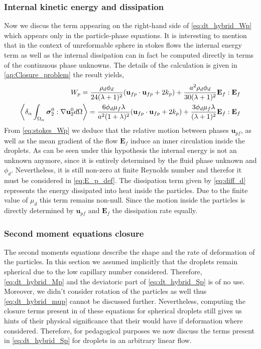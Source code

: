 \subsubsection{Internal kinetic energy and dissipation}
Now we discus the term appearing on the right-hand side of \ref{eq:dt_hybrid_Wp} which appears only in the particle-phase equations. 
It is interesting to mention that in the context of unreformable sphere in stokes flows the internal energy term as well as the internal dissipation can in fact be computed directly in terms of the continuous phase unknowns. 
The details of the calculation is given in \ref{ap:Closure_problem} the result yields, 
\begin{align}
    \label{eq:stokes_Wp}
    W_p =  \frac{\rho_d \phi_d}{24 (\lambda +1)^2}
    (\textbf{u}_{fp} \cdot \textbf{u}_{fp} + 2 k_p)
    + \frac{a^2 \rho_d \phi_d}{30(\lambda+1)^2}
    \textbf{E}_f:\textbf{E}_f    \\
    \left<\delta_\alpha \int_{\Omega_{\alpha}} \bm{\sigma}_2^0:\mathbf{\nabla} \textbf{u}_2^0 d\Omega\right>
    = 
    \frac{6 \phi_d \mu_f \lambda}{a^2(1+\lambda)^2}
    (\textbf{u}_{fp}\cdot \textbf{u}_{fp} + 2k_p)
    + \frac{3 \phi_d \mu_f \lambda}{(\lambda+1)^2}\textbf{E}_f:\textbf{E}_f
    \label{eq:diff_d}
\end{align}
From \ref{eq:stokes_Wp} we deduce that the relative motion between phases $\textbf{u}_{pf}$, as well as the mean gradient of the flow $\textbf{E}_f$ induce an inner circulation inside the droplets. 
As can be seen under this hypothesis the internal energy is not an unknown anymore, since it is entirely determined by the fluid phase unknown and $\phi_d$. 
Nevertheless, it is still non-zero at finite Reynolds number and therefor it must be considered in \ref{eq:E_p_def}. 
The dissipation term given by \ref{eq:diff_d} represents the energy dissipated into heat inside the particles. 
Due to the finite value of $\mu_d$ this term remains non-null. 
Since the motion inside the particles is directly determined by $\textbf{u}_{pf}$ and $\textbf{E}_f$ the dissipation rate equally. 


\subsubsection{Second moment equations closure}

The second moments equations describe the shape and the rate of deformation of the particles.
In this section we assumed implicitly that the droplets remain spherical due to the low capillary number considered. 
Therefore, \ref{eq:dt_hybrid_Mp} and the deviatoric part of \ref{eq:dt_hybrid_Sp} is of no use. 
Moreover, we didn't consider rotation of the particles as well thus \ref{eq:dt_hybrid_mup} cannot be discussed further. 
Nevertheless, computing the closure terms present in of these equations for spherical droplets still gives us hints of their physical significance that their would have if deformation where considered.
Therefore, for pedagogical purposes we now discuss the terms present in \ref{eq:dt_hybrid_Sp} for droplets in an arbitrary linear flow. 


